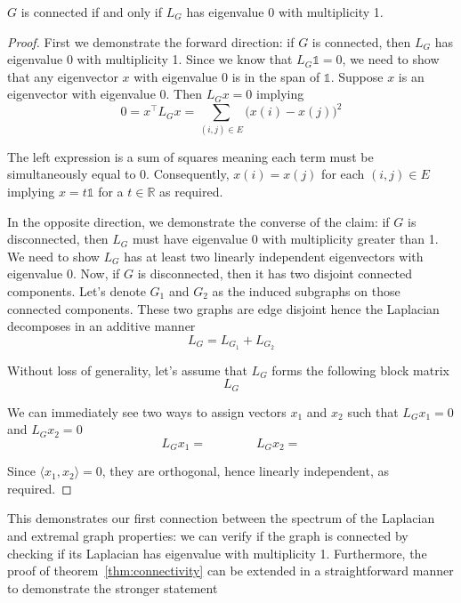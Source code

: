 \begin{theorem}\label{thm:connectivity}
$G$ is connected if and only if $L_G$ has eigenvalue 0 with multiplicity 1.
\end{theorem}
\begin{proof}
First we demonstrate the forward direction: if $G$ is connected, then $L_G$ has eigenvalue 0 with multiplicity 1. Since we know that $L_G \mathbb{1} = 0$, we need to show that any eigenvector $x$ with eigenvalue 0 is in the span of $\mathbb{1}$. Suppose $x$ is an eigenvector with eigenvalue 0. Then $L_G x = 0$ implying
\begin{equation*}
0 
= x^\top L_G x
= \sum_{(i, j) \in E} \big( x(i) - x(j) \big)^2 
\end{equation*}

The left expression is a sum of squares meaning each term must be simultaneously equal to 0. Consequently, $x(i) = x(j)$ for each $(i, j) \in E$ implying $x = t\mathbb{1}$ for a $t \in \mathbb{R}$ as required. 

In the opposite direction, we demonstrate the converse of the claim: if $G$ is disconnected, then $L_G$ must have eigenvalue 0 with multiplicity greater than 1. We need to show $L_G$ has at least two linearly independent eigenvectors with eigenvalue 0. Now, if $G$ is disconnected, then it has two disjoint connected components. Let's denote $G_1$ and $G_2$ as the induced subgraphs on those connected components. These two graphs are edge disjoint hence the Laplacian decomposes in an additive manner
\begin{equation*}
L_G = L_{G_1} + L_{G_2}
\end{equation*}

Without loss of generality, let's assume that $L_G$ forms the following block matrix
\begin{equation*}
L_G
\end{equation*}

We can immediately see two ways to assign vectors $x_1$ and $x_2$ such that $L_G x_1 = 0$ and $L_G x_2 = 0$
\begin{equation*}
L_G x_1 = 
\qquad\qquad
L_G x_2 =
\end{equation*}

Since $\langle x_1, x_2 \rangle = 0$, they are orthogonal, hence linearly independent, as required.
\end{proof}

This demonstrates our first connection between the spectrum of the Laplacian and extremal graph properties: we can verify if the graph is connected by checking if its Laplacian has eigenvalue with multiplicity 1. Furthermore, the proof of theorem~\ref{thm:connectivity} can be extended in a straightforward manner to demonstrate the stronger statement

